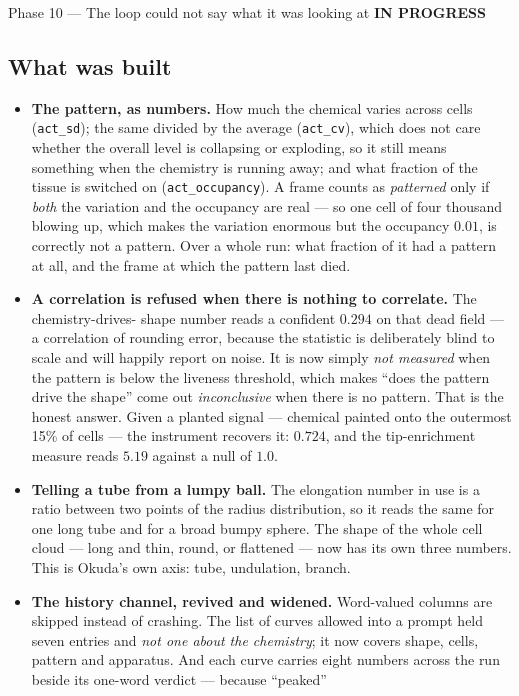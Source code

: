 \documentclass[11pt,a4paper]{article}
\newcommand{\code}[1]{\texttt{#1}}
\newcommand{\prog}{\textcolor{warn}{\textbf{IN PROGRESS}}}
\begin{document}
\begin{phasebox}{Phase 10 --- The loop could not say what it was looking at \hfill \prog}
\subsection*{What was built}
\begin{itemize}\itemsep2pt
\item \textbf{The pattern, as numbers.} How much the chemical varies across cells
      (\code{act\_sd}); the same divided by the average (\code{act\_cv}), which does not care
      whether the overall level is collapsing or exploding, so it still means something when the
      chemistry is running away; and what fraction of the tissue is switched on
      (\code{act\_occupancy}). A frame counts as \emph{patterned} only if \emph{both} the
      variation and the occupancy are real --- so one cell of four thousand blowing up, which
      makes the variation enormous but the occupancy $0.01$, is correctly not a pattern. Over a
      whole run: what fraction of it had a pattern at all, and the frame at which the pattern
      last died.
\item \textbf{A correlation is refused when there is nothing to correlate.} The chemistry-drives-
      shape number reads a confident $0.294$ on that dead field --- a correlation of rounding
      error, because the statistic is deliberately blind to scale and will happily report on
      noise. It is now simply \emph{not measured} when the pattern is below the liveness
      threshold, which makes ``does the pattern drive the shape'' come out \emph{inconclusive}
      when there is no pattern. That is the honest answer. Given a planted signal --- chemical
      painted onto the outermost 15\% of cells --- the instrument recovers it: $0.724$, and the
      tip-enrichment measure reads $5.19$ against a null of $1.0$.
\item \textbf{Telling a tube from a lumpy ball.} The elongation number in use is a ratio between
      two points of the radius distribution, so it reads the same for one long tube and for a
      broad bumpy sphere. The shape of the whole cell cloud --- long and thin, round, or
      flattened --- now has its own three numbers. This is Okuda's own axis: tube, undulation,
      branch.
\item \textbf{The history channel, revived and widened.} Word-valued columns are skipped instead
      of crashing. The list of curves allowed into a prompt held seven entries and \emph{not one
      about the chemistry}; it now covers shape, cells, pattern and apparatus. And each curve
      carries eight numbers across the run beside its one-word verdict --- because ``peaked''

\end{itemize}
\end{phasebox}
\end{document}
